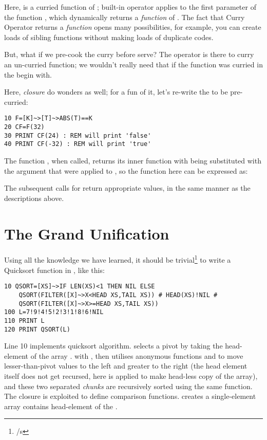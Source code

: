 Here,  is a curried function of ; built-in operator \code{\basiccurry} applies  to the first parameter of the function , which dynamically returns a \emph{function} of . The fact that Curry Operator returns a \emph{function} opens many possibilities, for example, you can create loads of sibling functions without making loads of duplicate codes.

But, what if we pre-cook the curry before serve? The \code{\basiccurry} operator is there to curry an un-curried function; we wouldn't really need that if the function was curried in the begin with.

Here, \emph{closure} do wonders as well; for a fun of it, let's re-write the  to be pre-curried:

\begin{lstlisting}
10 F=[K]~>[T]~>ABS(T)==K
20 CF=F(32)
30 PRINT CF(24) : REM will print 'false'
40 PRINT CF(-32) : REM will print 'true'
\end{lstlisting}

The function , when called, returns its inner function  with  being substituted with the argument that were applied to , so the function  here can be expressed as: 

The subsequent calls for  return appropriate values, in the same manner as the descriptions above.

\section[Wrapping-Up]{The Grand Unification}

Using all the knowledge we have learned, it should be trivial\footnote{/s} to write a Quicksort function in \tbas, like this:

\begin{lstlisting}
10 QSORT=[XS]~>IF LEN(XS)<1 THEN NIL ELSE 
    QSORT(FILTER([X]~>X<HEAD XS,TAIL XS)) # HEAD(XS)!NIL # 
    QSORT(FILTER([X]~>X>=HEAD XS,TAIL XS))
100 L=7!9!4!5!2!3!1!8!6!NIL
110 PRINT L
120 PRINT QSORT(L)
\end{lstlisting}

Line 10 implements quicksort algorithm.  selects a pivot by taking the head-element of the array . with , then utilises anonymous functions  and  to move lesser-than-pivot values to the left and greater to the right (the head element itself does not get recursed, here  is applied to make head-less copy of the array), and these two separated \emph{chunks} are recursively sorted using the same  function. The closure is exploited to define comparison functions.  creates a single-element array contains head-element of the .
